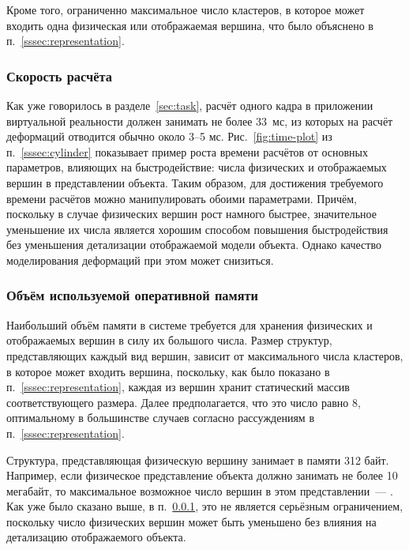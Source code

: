\documentclass[a4paper, 14pt, titlepage]{extarticle}
\newcommand{\num}[1]{\numprint{#1}}
\begin{document}
      Кроме того, ограниченно максимальное число кластеров, в которое может входить одна физическая
      или отображаемая вершина, что было объяснено в п.~\ref{sssec:representation}.

      \subsubsection{Скорость расчёта}\label{sssec:speed_limit}

        Как уже говорилось в разделе~\ref{sec:task}, расчёт одного кадра в приложении виртуальной реальности должен
        занимать не более 33~мс, из которых на расчёт деформаций отводится обычно около 3--5 мс. Рис.~\ref{fig:time-plot}
        из п.~\ref{sssec:cylinder} показывает пример роста времени расчётов от основных параметров,
        влияющих на быстродействие: числа физических и отображаемых вершин в представлении объекта.
        Таким образом, для достижения требуемого времени расчётов можно манипулировать обоими
        параметрами. Причём, поскольку в случае физических вершин рост намного быстрее, значительное
        уменьшение их числа является хорошим способом повышения быстродействия без уменьшения
        детализации отображаемой модели объекта. Однако качество моделирования деформаций при этом
        может снизиться.

      \subsubsection{Объём используемой оперативной памяти}

        Наибольший объём памяти в системе требуется для хранения физических и отображаемых вершин в
        силу их большого числа. Размер структур, представляющих каждый вид вершин, зависит от
        максимального числа кластеров, в которое может входить вершина, поскольку, как было показано
        в п.~\ref{sssec:representation}, каждая из вершин хранит статический массив соответствующего
        размера. Далее предполагается, что это число равно 8, оптимальному в большинстве случаев
        согласно рассуждениям в п.~\ref{sssec:representation}.

        Структура, представляющая физическую вершину занимает в памяти 312 байт. Например, если
        физическое представление объекта должно занимать не более 10 мегабайт, то максимальное
        возможное число вершин в этом представлении~--- \num{32051}. Как уже было сказано выше,
        в п.~\ref{sssec:speed_limit}, это не
        является серьёзным ограничением, поскольку число физических вершин может быть уменьшено без
        влияния на детализацию отображаемого объекта.
\end{document}
